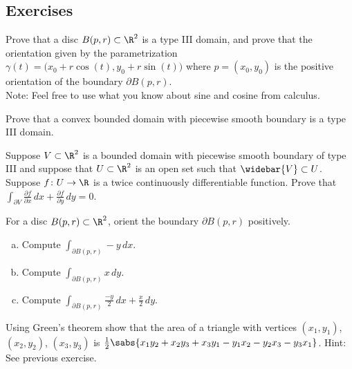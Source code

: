 \subsection{Exercises}

\begin{exercise} \label{green:balltype3orient}
Prove that a disc $B(p,r) \subset \R^2$ is a type III domain, and prove that
the orientation given by the parametrization $\gamma(t) =
\bigl(x_0+r\cos(t),y_0+r\sin(t)\bigr)$ where $p = (x_0,y_0)$ is the positive
orientation of the boundary $\partial B(p,r)$.
\\
Note: Feel free to use what you know about sine and cosine from calculus.
\end{exercise}

\begin{exercise}
Prove that a convex bounded domain with piecewise smooth boundary
is a type III domain.
\end{exercise}

\begin{exercise}
Suppose $V \subset \R^2$ is a bounded domain with piecewise smooth boundary
of type III and suppose that $U \subset \R^2$ is an open set such that
$\widebar{V} \subset U$.  Suppose $f \colon U \to \R$ is a twice
continuously differentiable function.  Prove that
$\int_{\partial V}
\frac{\partial f}{\partial x} \, dx + 
\frac{\partial f}{\partial y} \, dy = 0$.
\end{exercise}

\begin{samepage}
\begin{exercise}
For a disc $B(p,r) \subset \R^2$, orient the boundary $\partial B(p,r)$
positively.
\begin{enumerate}[a)]
\item
Compute $\displaystyle \int_{\partial B(p,r)} -y \, dx$.
\item
Compute $\displaystyle \int_{\partial B(p,r)} x \, dy$.
\item
Compute $\displaystyle \int_{\partial B(p,r)} \frac{-y}{2} \, dx +
\frac{x}{2} \, dy$.
\end{enumerate}
\end{exercise}
\end{samepage}

\begin{exercise}
Using Green's theorem show that the area of a triangle with
vertices
$(x_1,y_1)$,
$(x_2,y_2)$,
$(x_3,y_3)$ is
$\frac{1}{2}\sabs{x_1y_2 + x_2 y_3 + x_3 y_1 - y_1x_2 - y_2x_3 - y_3x_1}$.
Hint: See previous exercise.
\end{exercise}

